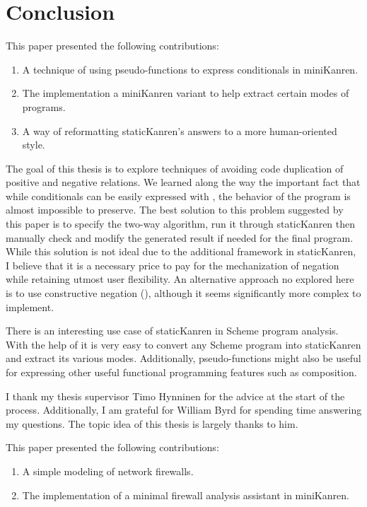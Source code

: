 \section{Conclusion}
\ifthesis
This paper presented the following contributions:
\begin{enumerate}
\item A technique of using pseudo-functions to express conditionals in miniKanren.
\item The implementation a miniKanren variant to help extract certain modes of programs.
\item A way of reformatting staticKanren's answers to a more human-oriented style.
\end{enumerate}

The goal of this thesis is to explore techniques of avoiding code duplication of positive and negative relations. We learned along the way the important fact that while conditionals can be easily expressed with , the behavior of the program is almost impossible to preserve. The best solution to this problem suggested by this paper is to specify the two-way algorithm, run it through staticKanren then manually check and modify the generated result if needed for the final program. While this solution is not ideal due to the additional framework in staticKanren, I believe that it is a necessary price to pay for the mechanization of negation while retaining utmost user flexibility. An alternative approach no explored here is to use constructive negation (\cite{chan}), although it seems significantly more complex to implement.

There is an interesting use case of staticKanren in Scheme program analysis. With the help of  it is very easy to convert any Scheme program into staticKanren and extract its various modes. Additionally, pseudo-functions might also be useful for expressing other useful functional programming features such as composition.

I thank my thesis supervisor Timo Hynninen for the advice at the start of the process. Additionally, I am grateful for William Byrd for spending time answering my questions. The topic idea of this thesis is largely thanks to him.






\else
This paper presented the following contributions:
\begin{enumerate}
\item A simple modeling of network firewalls.
\item The implementation of a minimal firewall analysis assistant in miniKanren.
\end{enumerate}

